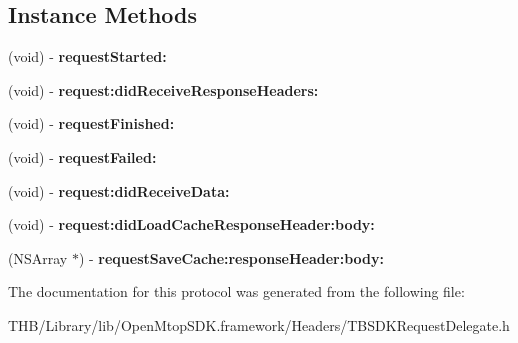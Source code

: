 \subsection*{Instance Methods}
\begin{DoxyCompactItemize}
\item 
\mbox{\label{protocol_t_b_s_d_k_request_delegate_01-p_a65125d8973f69edf495789a98d94a3cb}} 
(void) -\/ {\bfseries request\+Started\+:}
\item 
\mbox{\label{protocol_t_b_s_d_k_request_delegate_01-p_ab00c1e3036fb2a4eb2cbd7fabcfe5168}} 
(void) -\/ {\bfseries request\+:did\+Receive\+Response\+Headers\+:}
\item 
\mbox{\label{protocol_t_b_s_d_k_request_delegate_01-p_a543b44f9d9c92e24c0285cbac28a1922}} 
(void) -\/ {\bfseries request\+Finished\+:}
\item 
\mbox{\label{protocol_t_b_s_d_k_request_delegate_01-p_ade01d3ca34954b9be6868cb7db0b1516}} 
(void) -\/ {\bfseries request\+Failed\+:}
\item 
\mbox{\label{protocol_t_b_s_d_k_request_delegate_01-p_a454e9fc6ef65a53b2162aca07ae70538}} 
(void) -\/ {\bfseries request\+:did\+Receive\+Data\+:}
\item 
\mbox{\label{protocol_t_b_s_d_k_request_delegate_01-p_a6c1e027acb9e276c5e3da996190417ae}} 
(void) -\/ {\bfseries request\+:did\+Load\+Cache\+Response\+Header\+:body\+:}
\item 
\mbox{\label{protocol_t_b_s_d_k_request_delegate_01-p_a46f2eff982f15f2ab990c8505489551c}} 
(N\+S\+Array $\ast$) -\/ {\bfseries request\+Save\+Cache\+:response\+Header\+:body\+:}
\end{DoxyCompactItemize}


The documentation for this protocol was generated from the following file\+:\begin{DoxyCompactItemize}
\item 
T\+H\+B/\+Library/lib/\+Open\+Mtop\+S\+D\+K.\+framework/\+Headers/T\+B\+S\+D\+K\+Request\+Delegate.\+h\end{DoxyCompactItemize}
